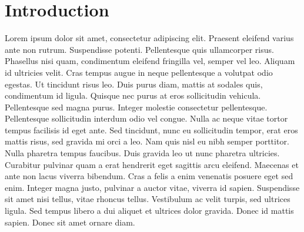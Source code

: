 \section*{Introduction}
Lorem ipsum dolor sit amet, consectetur adipiscing elit. Praesent eleifend varius ante non rutrum. Suspendisse potenti. Pellentesque quis ullamcorper risus. Phasellus nisi quam, condimentum eleifend fringilla vel, semper vel leo. Aliquam id ultricies velit. Cras tempus augue in neque pellentesque a volutpat odio egestas. Ut tincidunt risus leo. Duis purus diam, mattis at sodales quis, condimentum id ligula. Quisque nec purus at eros sollicitudin vehicula. Pellentesque sed magna purus. Integer molestie consectetur pellentesque. Pellentesque sollicitudin interdum odio vel congue. Nulla ac neque vitae tortor tempus facilisis id eget ante. 
Sed tincidunt, nunc eu sollicitudin tempor, erat eros mattis risus, sed gravida mi orci a leo. Nam quis nisl eu nibh semper porttitor. Nulla pharetra tempus faucibus. Duis gravida leo ut nunc pharetra ultricies. Curabitur pulvinar quam a erat hendrerit eget sagittis arcu eleifend. Maecenas et ante non lacus viverra bibendum. Cras a felis a enim venenatis posuere eget sed enim. Integer magna justo, pulvinar a auctor vitae, viverra id sapien. Suspendisse sit amet nisi tellus, vitae rhoncus tellus. Vestibulum ac velit turpis, sed ultrices ligula. Sed tempus libero a dui aliquet et ultrices dolor gravida. Donec id mattis sapien. Donec sit amet ornare diam.
